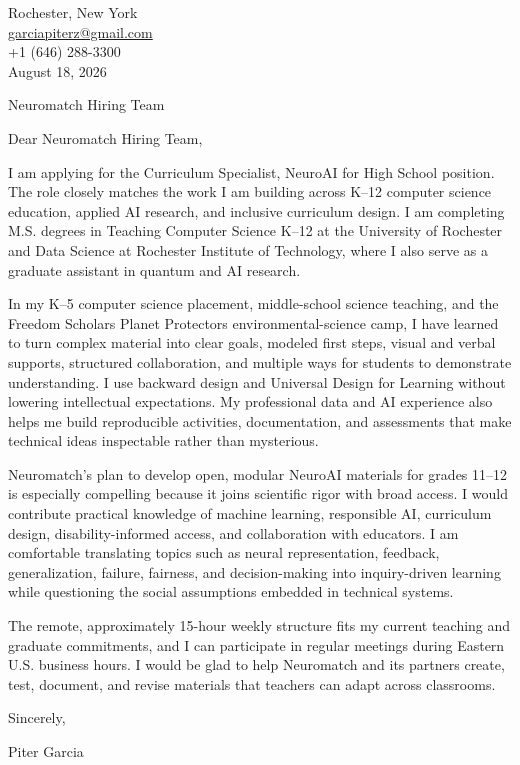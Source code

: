 \documentclass[11pt,letterpaper]{article}
\begin{document}
\begin{flushright}
Rochester, New York\\
\href{mailto:garciapiterz@gmail.com}{garciapiterz@gmail.com}\\
+1 (646) 288-3300\\[12pt]
August 18, 2026
\end{flushright}

Neuromatch Hiring Team

Dear Neuromatch Hiring Team,

I am applying for the Curriculum Specialist, NeuroAI for High School position.
The role closely matches the work I am building across K--12 computer science
education, applied AI research, and inclusive curriculum design. I am completing
M.S. degrees in Teaching Computer Science K--12 at the University of Rochester
and Data Science at Rochester Institute of Technology, where I also serve as a
graduate assistant in quantum and AI research.

In my K--5 computer science placement, middle-school science teaching, and the
Freedom Scholars Planet Protectors environmental-science camp, I have learned to
turn complex material into clear goals, modeled first steps, visual and verbal
supports, structured collaboration, and multiple ways for students to demonstrate
understanding. I use backward design and Universal Design for Learning without
lowering intellectual expectations. My professional data and AI experience also
helps me build reproducible activities, documentation, and assessments that make
technical ideas inspectable rather than mysterious.

Neuromatch's plan to develop open, modular NeuroAI materials for grades 11--12 is
especially compelling because it joins scientific rigor with broad access. I
would contribute practical knowledge of machine learning, responsible AI,
curriculum design, disability-informed access, and collaboration with educators.
I am comfortable translating topics such as neural representation, feedback,
generalization, failure, fairness, and decision-making into inquiry-driven
learning while questioning the social assumptions embedded in technical systems.

The remote, approximately 15-hour weekly structure fits my current teaching and
graduate commitments, and I can participate in regular meetings during Eastern
U.S. business hours. I would be glad to help Neuromatch and its partners create,
test, document, and revise materials that teachers can adapt across classrooms.

Sincerely,

Piter Garcia
\end{document}
